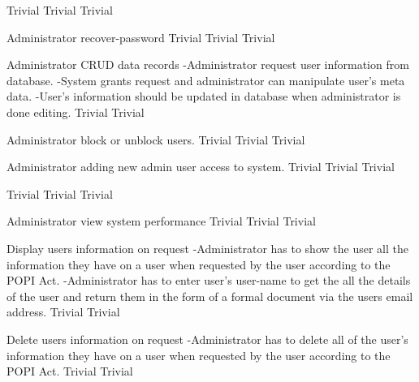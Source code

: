   	{Trivial}
	 	{Trivial}
  	{Trivial}
	  
\FuncReq
    {Administrator recover-password}		
		{Trivial}
  	{Trivial}
		{Trivial}
 
\FuncReq
    {Administrator CRUD data records}
		{-Administrator request user information from database.
		-System grants request and administrator can manipulate user's meta data.
		-User's information should be updated in database when administrator is done editing.}
		{Trivial}
 		{Trivial}

\FuncReq
    {Administrator block or unblock users.}   
    {Trivial}
    {Trivial}
    {Trivial}
		
\FuncReq
    {Administrator adding new admin user access to system.}
    {Trivial}
    {Trivial}
    {Trivial}
		
    {Trivial}
    {Trivial}
 	 	{Trivial}

\FuncReq
    {Administrator view system performance}
    {Trivial}
    {Trivial}
    {Trivial}

\FuncReq
    {Display users information on request}
    {-Administrator has to show the user all the information they have on a user when requested by the user according to the POPI Act.
  	-Administrator has to enter user's user-name to get the all the details of the user and return them in the form of a formal document via the users email address.
    }
	{Trivial}
	{Trivial}

\FuncReq
  {Delete users information on request}
	{-Administrator has to delete all of the user's information they have on a user when requested by the user according to the POPI Act.}
	{Trivial}
	{Trivial}

